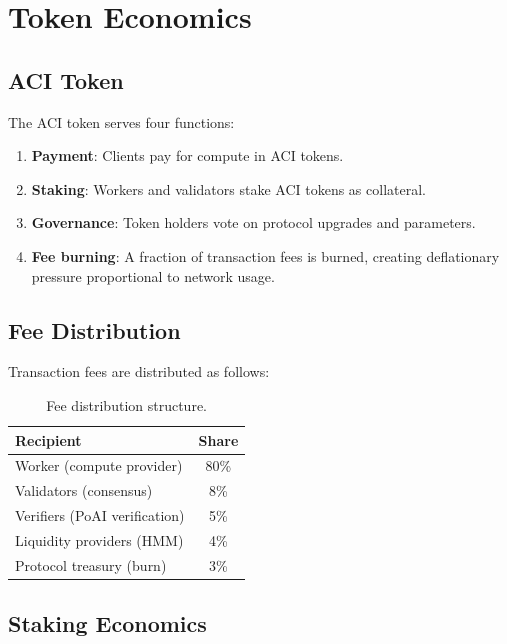 \section{Token Economics}

\label{sec:tokenomics}

\subsection{ACI Token}

The ACI token serves four functions:

\begin{enumerate}[leftmargin=1.4em]
    \item \textbf{Payment}: Clients pay for compute in ACI tokens.
    \item \textbf{Staking}: Workers and validators stake ACI tokens as collateral.
    \item \textbf{Governance}: Token holders vote on protocol upgrades and parameters.
    \item \textbf{Fee burning}: A fraction of transaction fees is burned, creating deflationary pressure proportional to network usage.
\end{enumerate}

\subsection{Fee Distribution}

Transaction fees are distributed as follows:

\begin{table}[H]
\centering
\begin{tabular}{lc}
\toprule
\textbf{Recipient} & \textbf{Share} \\
\midrule
Worker (compute provider) & 80\% \\
Validators (consensus) & 8\% \\
Verifiers (PoAI verification) & 5\% \\
Liquidity providers (HMM) & 4\% \\
Protocol treasury (burn) & 3\% \\
\bottomrule
\end{tabular}
\caption{Fee distribution structure.}
\label{tab:fees}
\end{table}

\subsection{Staking Economics}

